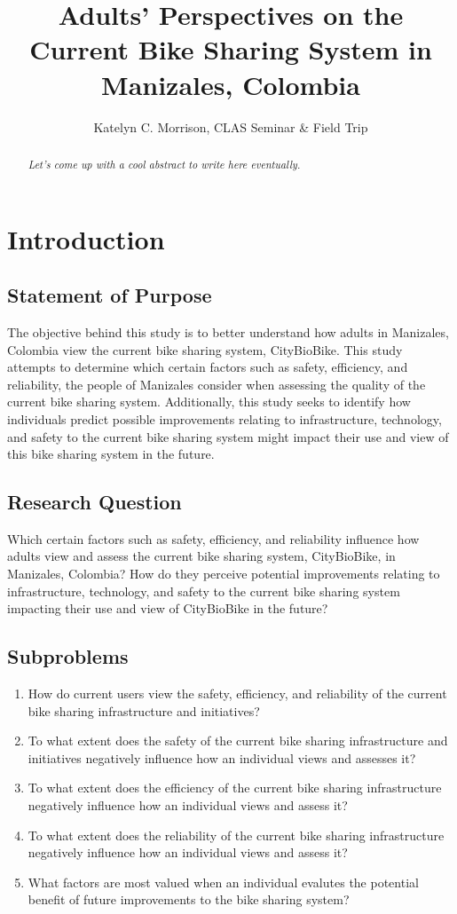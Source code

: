 \documentclass[12pt]{article}
\title{Adults' Perspectives on the Current Bike Sharing System in Manizales, Colombia
}
\author{
    Katelyn C. Morrison,
    CLAS Seminar \& Field Trip
}
\date{}
\begin{document}
\maketitle

\begin{abstract}
    \textit{Let's come up with a cool abstract to write here eventually.}
\end{abstract}

\section*{Introduction}

\subsection*{Statement of Purpose}
The objective behind this study is to better understand how adults in Manizales, Colombia view the current bike sharing system, CityBioBike.
This study attempts to determine which certain factors such as safety, efficiency, and reliability,
the people of Manizales consider when assessing the quality of the current bike sharing system. Additionally, this study seeks to identify how individuals predict
possible improvements relating to infrastructure, technology, and safety to the current bike sharing system might 
impact their use and view of this bike sharing system in the future.
\subsection*{Research Question}
Which certain factors such as safety, efficiency, and reliability influence how 
adults view and assess the current bike sharing system, CityBioBike, in Manizales, Colombia? 
How do they perceive potential improvements relating to infrastructure, technology, and safety
to the current bike sharing system impacting their use and view of CityBioBike in the future?

\subsection*{Subproblems}
\begin{enumerate}
    \item How do current users view the safety, efficiency, and reliability of the current bike sharing infrastructure and initiatives?
    \item To what extent does the safety of the current bike sharing infrastructure and initiatives negatively influence how an
    individual views and assesses it?
    \item To what extent does the efficiency of the current bike sharing infrastructure negatively influence how an
    individual views and assess it?
    \item To what extent does the reliability of the current bike sharing infrastructure negatively influence how an
    individual views and assess it?
    \item What factors are most valued when an individual evalutes the potential benefit of future improvements to the bike sharing system?
\end{enumerate}
\end{document}
